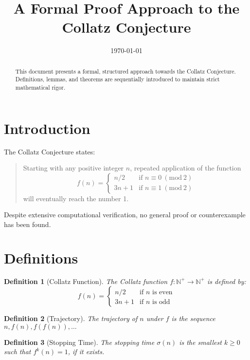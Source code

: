 \documentclass{article}
\title{A Formal Proof Approach to the Collatz Conjecture}
\author{ }
\date{\today}
\newtheorem{definition}{Definition}
\begin{document}
\maketitle

\begin{abstract}
This document presents a formal, structured approach towards the Collatz Conjecture. Definitions, lemmas, and theorems are sequentially introduced to maintain strict mathematical rigor.
\end{abstract}

\section{Introduction}
The Collatz Conjecture states:
\begin{quote}
Starting with any positive integer $n$, repeated application of the function
\[f(n) = \begin{cases}
    n/2 & \text{if } n \equiv 0 \ (\mathrm{mod} \ 2) \\
    3n+1 & \text{if } n \equiv 1 \ (\mathrm{mod} \ 2)
\end{cases}\]
will eventually reach the number 1.
\end{quote}
Despite extensive computational verification, no general proof or counterexample has been found.

\section{Definitions}

\begin{definition}[Collatz Function]
The Collatz function $f: \mathbb{N}^+ \to \mathbb{N}^+$ is defined by:
\[f(n) = \begin{cases}
    n/2 & \text{if } n \text{ is even} \\
    3n+1 & \text{if } n \text{ is odd}
\end{cases}\]
\end{definition}

\begin{definition}[Trajectory]
The trajectory of $n$ under $f$ is the sequence $n, f(n), f(f(n)), \ldots$
\end{definition}

\begin{definition}[Stopping Time]
The stopping time $\sigma(n)$ is the smallest $k \geq 0$ such that $f^k(n) = 1$, if it exists.
\end{definition}
\end{document}
